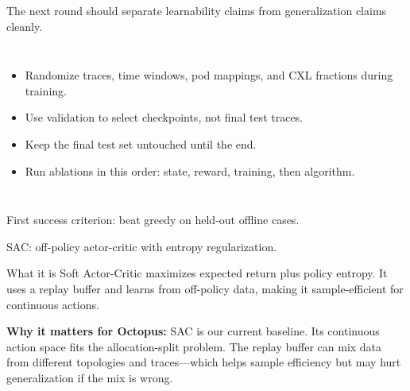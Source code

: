 \documentclass[11pt,aspectratio=43]{beamer}
\begin{document}
\begin{frame}{The next round should separate learnability claims from generalization claims cleanly.}
  \begin{columns}[T,onlytextwidth]
      \centering
      \begin{itemize}
        \item Randomize traces, time windows, pod mappings, and CXL fractions during training.
        \item Use validation to select checkpoints, not final test traces.
        \item Keep the final test set untouched until the end.
        \item Run ablations in this order: state, reward, training, then algorithm.
      \end{itemize}
  \end{columns}
  \alert{First success criterion:} beat greedy on held-out offline cases.
\end{frame}

\begin{frame}{SAC: off-policy actor-critic with entropy regularization.}
  \begin{block}{What it is}
    Soft Actor-Critic \cite{haarnoja2018sac} maximizes expected return plus policy entropy. It uses a replay buffer and learns from off-policy data, making it sample-efficient for continuous actions.
  \end{block}
  \vspace{0.4em}
  \textbf{Why it matters for Octopus:} SAC is our current baseline. Its continuous action space fits the allocation-split problem. The replay buffer can mix data from different topologies and traces---which helps sample efficiency but may hurt generalization if the mix is wrong.
\end{frame}
\end{document}
